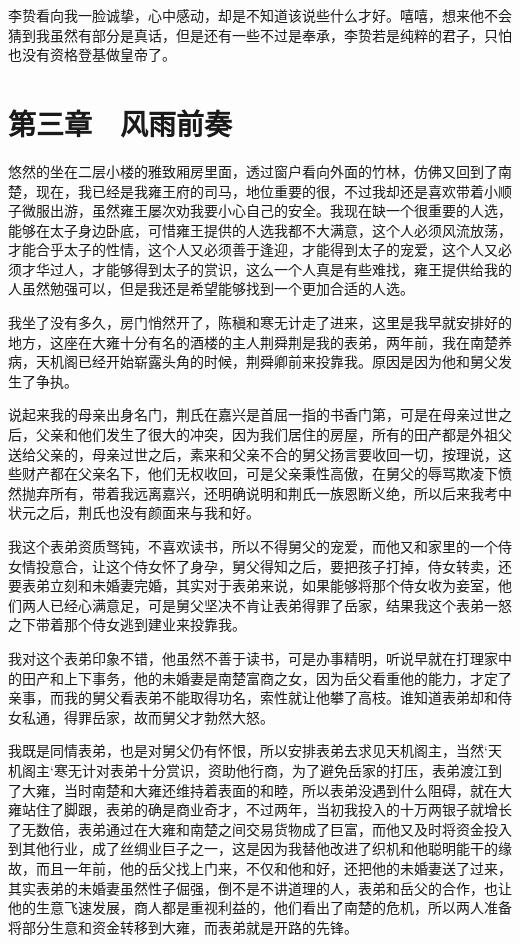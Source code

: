 李贽看向我一脸诚挚，心中感动，却是不知道该说些什么才好。嘻嘻，想来他不会猜到我虽然有部分是真话，但是还有一些不过是奉承，李贽若是纯粹的君子，只怕也没有资格登基做皇帝了。

\chapter{第三章　风雨前奏}

悠然的坐在二层小楼的雅致厢房里面，透过窗户看向外面的竹林，仿佛又回到了南楚，现在，我已经是我雍王府的司马，地位重要的很，不过我却还是喜欢带着小顺子微服出游，虽然雍王屡次劝我要小心自己的安全。我现在缺一个很重要的人选，能够在太子身边卧底，可惜雍王提供的人选我都不大满意，这个人必须风流放荡，才能合乎太子的性情，这个人又必须善于逢迎，才能得到太子的宠爱，这个人又必须才华过人，才能够得到太子的赏识，这么一个人真是有些难找，雍王提供给我的人虽然勉强可以，但是我还是希望能够找到一个更加合适的人选。

我坐了没有多久，房门悄然开了，陈稹和寒无计走了进来，这里是我早就安排好的地方，这座在大雍十分有名的酒楼的主人荆舜荆是我的表弟，两年前，我在南楚养病，天机阁已经开始崭露头角的时候，荆舜卿前来投靠我。原因是因为他和舅父发生了争执。

说起来我的母亲出身名门，荆氏在嘉兴是首屈一指的书香门第，可是在母亲过世之后，父亲和他们发生了很大的冲突，因为我们居住的房屋，所有的田产都是外祖父送给父亲的，母亲过世之后，素来和父亲不合的舅父扬言要收回一切，按理说，这些财产都在父亲名下，他们无权收回，可是父亲秉性高傲，在舅父的辱骂欺凌下愤然抛弃所有，带着我远离嘉兴，还明确说明和荆氏一族恩断义绝，所以后来我考中状元之后，荆氏也没有颜面来与我和好。

我这个表弟资质驽钝，不喜欢读书，所以不得舅父的宠爱，而他又和家里的一个侍女情投意合，让这个侍女怀了身孕，舅父得知之后，要把孩子打掉，侍女转卖，还要表弟立刻和未婚妻完婚，其实对于表弟来说，如果能够将那个侍女收为妾室，他们两人已经心满意足，可是舅父坚决不肯让表弟得罪了岳家，结果我这个表弟一怒之下带着那个侍女逃到建业来投靠我。

我对这个表弟印象不错，他虽然不善于读书，可是办事精明，听说早就在打理家中的田产和上下事务，他的未婚妻是南楚富商之女，因为岳父看重他的能力，才定了亲事，而我的舅父看表弟不能取得功名，索性就让他攀了高枝。谁知道表弟却和侍女私通，得罪岳家，故而舅父才勃然大怒。

我既是同情表弟，也是对舅父仍有怀恨，所以安排表弟去求见天机阁主，当然‘天机阁主‘寒无计对表弟十分赏识，资助他行商，为了避免岳家的打压，表弟渡江到了大雍，当时南楚和大雍还维持着表面的和睦，所以表弟没遇到什么阻碍，就在大雍站住了脚跟，表弟的确是商业奇才，不过两年，当初我投入的十万两银子就增长了无数倍，表弟通过在大雍和南楚之间交易货物成了巨富，而他又及时将资金投入到其他行业，成了丝绸业巨子之一，这是因为我替他改进了织机和他聪明能干的缘故，而且一年前，他的岳父找上门来，不仅和他和好，还把他的未婚妻送了过来，其实表弟的未婚妻虽然性子倔强，倒不是不讲道理的人，表弟和岳父的合作，也让他的生意飞速发展，商人都是重视利益的，他们看出了南楚的危机，所以两人准备将部分生意和资金转移到大雍，而表弟就是开路的先锋。

